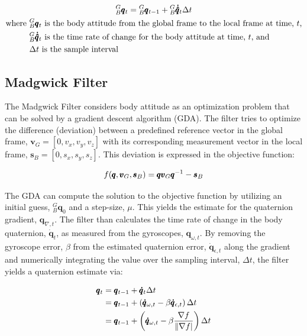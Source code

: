 \begin{gather} \labeq{mahony_filter}
    {}^G_B\pmb{q}_t = {}^G_B\pmb{q}_{t-1} + {}^G_B\pmb{\dot{\hat{q}}}_t \Delta t \\
    \begin{aligned}
        \text{where } &{}^G_B\pmb{q}_t \text{ is the body attitude from the global frame to the local frame at time, $t$,} \\
                      &{}^G_B\pmb{\dot{\hat{q}}}_t \text{ is the time rate of change for the body attitude at time, $t$, and } \\
                      &\Delta t \text{ is the sample interval}
    \end{aligned} \notag
\end{gather}

\subsection{Madgwick Filter} 
The Madgwick Filter \cite{Madgwick:dissertation} considers body attitude as an optimization problem that can be solved by a gradient descent algorithm (GDA).
The filter tries to optimize the difference (deviation) between a predefined reference vector in the global frame, $\pmb{v}_G = [0, v_x, v_y, v_z]$ with its corresponding measurement vector in the local frame, $\pmb{s}_B = [0, s_x, s_y, s_z]$.
This deviation is expressed in the objective function:

\begin{equation} \labeq{madgwick_obj_func}
    f(\pmb{q}, \pmb{v}_G, \pmb{s}_B) = \pmb{q} \pmb{v}_G \pmb{q}^{-1} - \pmb{s}_B
\end{equation}

The GDA can compute the solution to the objective function by utilizing an initial guess, ${}^G_B \pmb{q}_0$ and a step-size, $\mu$.
This yields the estimate for the quaternion gradient, $\pmb{q}_{\nabla,t}$.
The filter than calculates the time rate of change in the body quaternion, $\pmb{\dot{q}}_t$, as measured from the gyroscopes, $\pmb{q}_{\omega,t}$.
By removing the gyroscope error, $\beta$ from the estimated quaternion error, $\pmb{\dot{q}}_{\epsilon, t}$ along the gradient and numerically integrating the value over the sampling interval, $\Delta t$, the filter yields a quaternion estimate via:

\begin{align} \labeq{madgwick_filter}
    \pmb{q}_t &= \pmb{q}_{t-1} + \pmb{\dot{q}}_t \Delta t \\
              &= \pmb{q}_{t-1} + \left( \pmb{\dot{q}}_{\omega, t} - \beta \pmb{\dot{q}}_{\epsilon, t} \right) \Delta t \\
              &= \pmb{q}_{t-1} + \left( \pmb{\dot{q}}_{\omega, t} - \beta \frac{\nabla f}{\lVert \nabla f \rvert}\right) \Delta t
\end{align}

